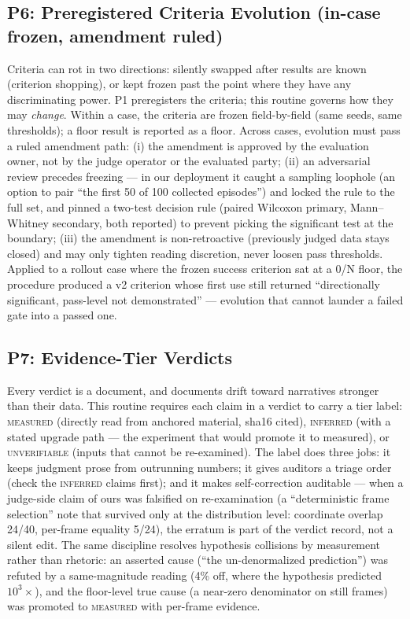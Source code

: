 \documentclass[11pt]{article}
\begin{document}
\subsection{P6: Preregistered Criteria Evolution (in-case frozen, amendment ruled)}
Criteria can rot in two directions: silently swapped after results are known
(criterion shopping), or kept frozen past the point where they have any
discriminating power. P1 preregisters the criteria; this routine governs how
they may \emph{change}. Within a case, the criteria are frozen field-by-field
(same seeds, same thresholds); a floor result is reported as a floor. Across
cases, evolution must pass a ruled amendment path: (i) the amendment is
approved by the evaluation owner, not by the judge operator or the evaluated
party; (ii) an adversarial review precedes freezing --- in our deployment it
caught a sampling loophole (an option to pair ``the first 50 of 100 collected
episodes'') and locked the rule to the full set, and pinned a two-test
decision rule (paired Wilcoxon primary, Mann--Whitney secondary, both
reported) to prevent picking the significant test at the boundary; (iii) the
amendment is non-retroactive (previously judged data stays closed) and may
only tighten reading discretion, never loosen pass thresholds. Applied to a
rollout case where the frozen success criterion sat at a 0/N floor, the
procedure produced a v2 criterion whose first use still returned
``directionally significant, pass-level not demonstrated'' --- evolution that
cannot launder a failed gate into a passed one.

\subsection{P7: Evidence-Tier Verdicts}
Every verdict is a document, and documents drift toward narratives stronger
than their data. This routine requires each claim in a verdict to carry a
tier label: \textsc{measured} (directly read from anchored material, sha16
cited), \textsc{inferred} (with a stated upgrade path --- the experiment that
would promote it to measured), or \textsc{unverifiable} (inputs that cannot
be re-examined). The label does three jobs: it keeps judgment prose from
outrunning numbers; it gives auditors a triage order (check the
\textsc{inferred} claims first); and it makes self-correction auditable ---
when a judge-side claim of ours was falsified on re-examination (a
``deterministic frame selection'' note that survived only at the
distribution level: coordinate overlap 24/40, per-frame equality 5/24), the
erratum is part of the verdict record, not a silent edit. The same discipline
resolves hypothesis collisions by measurement rather than rhetoric: an
asserted cause (``the un-denormalized prediction'') was refuted by a
same-magnitude reading (4\% off, where the hypothesis predicted
$10^3\times$), and the floor-level true cause (a near-zero denominator on
still frames) was promoted to \textsc{measured} with per-frame evidence.
\end{document}
